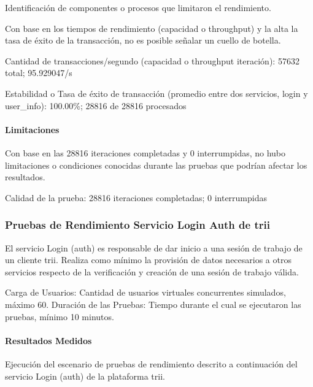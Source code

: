 \documentclass[
  paper=a4,
  ,captions=tableheading
]{scrartcl}
\renewenvironment{quote}{\begin{customblockquote}\list{}{\rightmargin=0em\leftmargin=0em}%
\item\relax\color{blockquote-text}\ignorespaces}{\unskip\unskip\endlist\end{customblockquote}}
\begin{document}
Identificación de componentes o procesos que limitaron el rendimiento.

Con base en los tiempos de rendimiento (capacidad o throughput) y la
alta la tasa de éxito de la transacción, no es posible señalar un cuello
de botella.

\begin{quote}
Cantidad de transacciones/segundo (capacidad o throughput iteración):
57632 total; 95.929047/s

Estabilidad o Tasa de éxito de transacción (promedio entre dos
servicios, login y user\_info): 100.00\%; 28816 de 28816 procesados
\end{quote}

\paragraph{Limitaciones}\label{sec:limitaciones}

Con base en las 28816 iteraciones completadas y 0 interrumpidas, no hubo
limitaciones o condiciones conocidas durante las pruebas que podrían
afectar los resultados.

\begin{quote}
Calidad de la prueba: 28816 iteraciones completadas; 0 interrumpidas
\end{quote}

\subsubsection{Pruebas de Rendimiento Servicio Login Auth de
trii}\label{sec:pruebas-de-rendimiento-servicio-login-auth-de-trii}

El servicio Login (auth) es responsable de dar inicio a una sesión de
trabajo de un cliente trii. Realiza como mínimo la provisión de datos
necesarios a otros servicios respecto de la verificación y creación de
una sesión de trabajo válida.

Carga de Usuarios: Cantidad de usuarios virtuales concurrentes
simulados, máximo 60. Duración de las Pruebas: Tiempo durante el cual se
ejecutaron las pruebas, mínimo 10 minutos.

\paragraph{Resultados Medidos}\label{sec:resultados-medidos-1}

Ejecución del escenario de pruebas de rendimiento descrito a
continuación del servicio Login (auth) de la plataforma trii.
\end{document}
